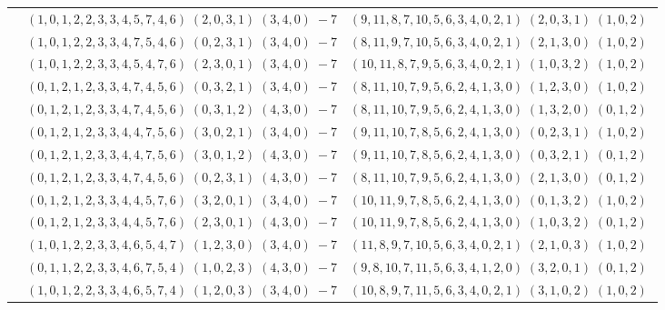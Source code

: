 \documentclass[11pt]{article}
\begin{document}
\begin{longtable}[l]{|c|c|c|}
 \cline{2-3} 
 & $(1 ,0 ,1 ,2 ,2 ,3 ,3 ,4 ,5 ,7 ,4 ,6) \;(2 ,0 ,3 ,1) \;(3 ,4 ,0) \;-7$ & $(9 ,11 ,8 ,7 ,10 ,5 ,6 ,3 ,4 ,0 ,2 ,1) \;(2 ,0 ,3 ,1) \;(1 ,0 ,2) \;$\\ 
 \cline{2-3} 
 & $(1 ,0 ,1 ,2 ,2 ,3 ,3 ,4 ,7 ,5 ,4 ,6) \;(0 ,2 ,3 ,1) \;(3 ,4 ,0) \;-7$ & $(8 ,11 ,9 ,7 ,10 ,5 ,6 ,3 ,4 ,0 ,2 ,1) \;(2 ,1 ,3 ,0) \;(1 ,0 ,2) \;$\\ 
 \cline{2-3} 
 & $(1 ,0 ,1 ,2 ,2 ,3 ,3 ,4 ,5 ,4 ,7 ,6) \;(2 ,3 ,0 ,1) \;(3 ,4 ,0) \;-7$ & $(10 ,11 ,8 ,7 ,9 ,5 ,6 ,3 ,4 ,0 ,2 ,1) \;(1 ,0 ,3 ,2) \;(1 ,0 ,2) \;$\\ 
 \cline{2-3} 
 & $(0 ,1 ,2 ,1 ,2 ,3 ,3 ,4 ,7 ,4 ,5 ,6) \;(0 ,3 ,2 ,1) \;(3 ,4 ,0) \;-7$ & $(8 ,11 ,10 ,7 ,9 ,5 ,6 ,2 ,4 ,1 ,3 ,0) \;(1 ,2 ,3 ,0) \;(1 ,0 ,2) \;$\\ 
 \cline{2-3} 
 & $(0 ,1 ,2 ,1 ,2 ,3 ,3 ,4 ,7 ,4 ,5 ,6) \;(0 ,3 ,1 ,2) \;(4 ,3 ,0) \;-7$ & $(8 ,11 ,10 ,7 ,9 ,5 ,6 ,2 ,4 ,1 ,3 ,0) \;(1 ,3 ,2 ,0) \;(0 ,1 ,2) \;$\\ 
 \cline{2-3} 
 & $(0 ,1 ,2 ,1 ,2 ,3 ,3 ,4 ,4 ,7 ,5 ,6) \;(3 ,0 ,2 ,1) \;(3 ,4 ,0) \;-7$ & $(9 ,11 ,10 ,7 ,8 ,5 ,6 ,2 ,4 ,1 ,3 ,0) \;(0 ,2 ,3 ,1) \;(1 ,0 ,2) \;$\\ 
 \cline{2-3} 
 & $(0 ,1 ,2 ,1 ,2 ,3 ,3 ,4 ,4 ,7 ,5 ,6) \;(3 ,0 ,1 ,2) \;(4 ,3 ,0) \;-7$ & $(9 ,11 ,10 ,7 ,8 ,5 ,6 ,2 ,4 ,1 ,3 ,0) \;(0 ,3 ,2 ,1) \;(0 ,1 ,2) \;$\\ 
 \cline{2-3} 
 & $(0 ,1 ,2 ,1 ,2 ,3 ,3 ,4 ,7 ,4 ,5 ,6) \;(0 ,2 ,3 ,1) \;(4 ,3 ,0) \;-7$ & $(8 ,11 ,10 ,7 ,9 ,5 ,6 ,2 ,4 ,1 ,3 ,0) \;(2 ,1 ,3 ,0) \;(0 ,1 ,2) \;$\\ 
 \cline{2-3} 
 & $(0 ,1 ,2 ,1 ,2 ,3 ,3 ,4 ,4 ,5 ,7 ,6) \;(3 ,2 ,0 ,1) \;(3 ,4 ,0) \;-7$ & $(10 ,11 ,9 ,7 ,8 ,5 ,6 ,2 ,4 ,1 ,3 ,0) \;(0 ,1 ,3 ,2) \;(1 ,0 ,2) \;$\\ 
 \cline{2-3} 
 & $(0 ,1 ,2 ,1 ,2 ,3 ,3 ,4 ,4 ,5 ,7 ,6) \;(2 ,3 ,0 ,1) \;(4 ,3 ,0) \;-7$ & $(10 ,11 ,9 ,7 ,8 ,5 ,6 ,2 ,4 ,1 ,3 ,0) \;(1 ,0 ,3 ,2) \;(0 ,1 ,2) \;$\\ 
 \cline{2-3} 
 & $(1 ,0 ,1 ,2 ,2 ,3 ,3 ,4 ,6 ,5 ,4 ,7) \;(1 ,2 ,3 ,0) \;(3 ,4 ,0) \;-7$ & $(11 ,8 ,9 ,7 ,10 ,5 ,6 ,3 ,4 ,0 ,2 ,1) \;(2 ,1 ,0 ,3) \;(1 ,0 ,2) \;$\\ 
 \cline{2-3} 
 & $(0 ,1 ,1 ,2 ,2 ,3 ,3 ,4 ,6 ,7 ,5 ,4) \;(1 ,0 ,2 ,3) \;(4 ,3 ,0) \;-7$ & $(9 ,8 ,10 ,7 ,11 ,5 ,6 ,3 ,4 ,1 ,2 ,0) \;(3 ,2 ,0 ,1) \;(0 ,1 ,2) \;$\\ 
 \cline{2-3} 
 & $(1 ,0 ,1 ,2 ,2 ,3 ,3 ,4 ,6 ,5 ,7 ,4) \;(1 ,2 ,0 ,3) \;(3 ,4 ,0) \;-7$ & $(10 ,8 ,9 ,7 ,11 ,5 ,6 ,3 ,4 ,0 ,2 ,1) \;(3 ,1 ,0 ,2) \;(1 ,0 ,2) \;$\\ 

\end{longtable}
\end{document}
